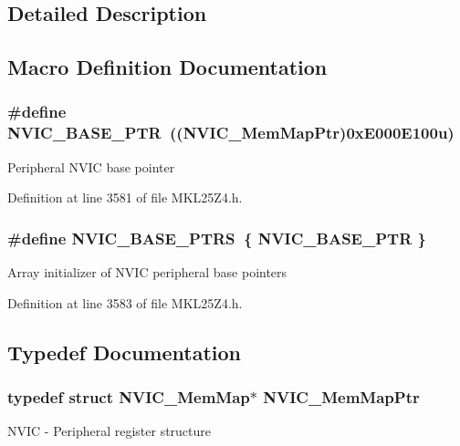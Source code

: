 \subsection{Detailed Description}


\subsection{Macro Definition Documentation}
\subsubsection[{\texorpdfstring{N\+V\+I\+C\+\_\+\+B\+A\+S\+E\+\_\+\+P\+TR}{NVIC_BASE_PTR}}]{\setlength{\rightskip}{0pt plus 5cm}\#define N\+V\+I\+C\+\_\+\+B\+A\+S\+E\+\_\+\+P\+TR~(({\bf N\+V\+I\+C\+\_\+\+Mem\+Map\+Ptr})0x\+E000\+E100u)}\hypertarget{group___n_v_i_c___peripheral_ga28f0a055d0c218e16d1fc7b13ff0caa5}{}\label{group___n_v_i_c___peripheral_ga28f0a055d0c218e16d1fc7b13ff0caa5}
Peripheral N\+V\+IC base pointer 

Definition at line 3581 of file M\+K\+L25\+Z4.\+h.

\subsubsection[{\texorpdfstring{N\+V\+I\+C\+\_\+\+B\+A\+S\+E\+\_\+\+P\+T\+RS}{NVIC_BASE_PTRS}}]{\setlength{\rightskip}{0pt plus 5cm}\#define N\+V\+I\+C\+\_\+\+B\+A\+S\+E\+\_\+\+P\+T\+RS~\{ {\bf N\+V\+I\+C\+\_\+\+B\+A\+S\+E\+\_\+\+P\+TR} \}}\hypertarget{group___n_v_i_c___peripheral_ga25b6ce0c871e09199e515cbb1716fe26}{}\label{group___n_v_i_c___peripheral_ga25b6ce0c871e09199e515cbb1716fe26}
Array initializer of N\+V\+IC peripheral base pointers 

Definition at line 3583 of file M\+K\+L25\+Z4.\+h.



\subsection{Typedef Documentation}
\subsubsection[{\texorpdfstring{N\+V\+I\+C\+\_\+\+Mem\+Map\+Ptr}{NVIC_MemMapPtr}}]{\setlength{\rightskip}{0pt plus 5cm}typedef struct {\bf N\+V\+I\+C\+\_\+\+Mem\+Map}$\ast$ {\bf N\+V\+I\+C\+\_\+\+Mem\+Map\+Ptr}}\hypertarget{group___n_v_i_c___peripheral_ga685d87c766bb24fb3330aa8cc48fa0e7}{}\label{group___n_v_i_c___peripheral_ga685d87c766bb24fb3330aa8cc48fa0e7}
N\+V\+IC -\/ Peripheral register structure 